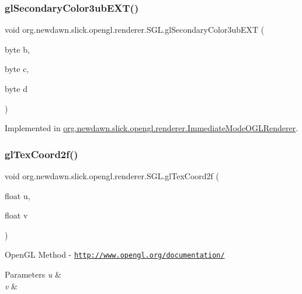 \subsubsection{\texorpdfstring{gl\+Secondary\+Color3ub\+E\+X\+T()}{glSecondaryColor3ubEXT()}}
{\footnotesize\ttfamily void org.\+newdawn.\+slick.\+opengl.\+renderer.\+S\+G\+L.\+gl\+Secondary\+Color3ub\+E\+XT (\begin{DoxyParamCaption}\item[{byte}]{b,  }\item[{byte}]{c,  }\item[{byte}]{d }\end{DoxyParamCaption})}



Implemented in \mbox{\hyperlink{classorg_1_1newdawn_1_1slick_1_1opengl_1_1renderer_1_1_immediate_mode_o_g_l_renderer_a84d95cf18d125c1cc9c0ddc6d3ce925d}{org.\+newdawn.\+slick.\+opengl.\+renderer.\+Immediate\+Mode\+O\+G\+L\+Renderer}}.

\mbox{\label{interfaceorg_1_1newdawn_1_1slick_1_1opengl_1_1renderer_1_1_s_g_l_a5f661318cf9926c586a9837d0ded9fbd}} 
\subsubsection{\texorpdfstring{gl\+Tex\+Coord2f()}{glTexCoord2f()}}
{\footnotesize\ttfamily void org.\+newdawn.\+slick.\+opengl.\+renderer.\+S\+G\+L.\+gl\+Tex\+Coord2f (\begin{DoxyParamCaption}\item[{float}]{u,  }\item[{float}]{v }\end{DoxyParamCaption})}

Open\+GL Method -\/  \href{http://www.opengl.org/documentation/}{\tt http\+://www.\+opengl.\+org/documentation/}


\begin{DoxyParams}{Parameters}
{\em u} & \\
\hline
{\em v} & \\
\hline
\end{DoxyParams}


